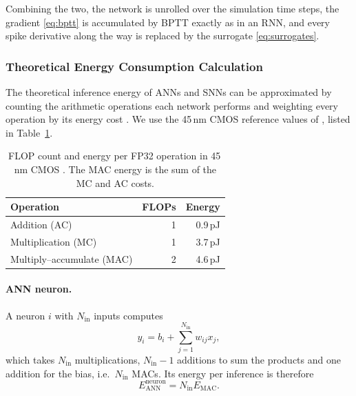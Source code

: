     Combining the two, the network is unrolled over the simulation time steps, the gradient \eqref{eq:bptt} is accumulated by BPTT exactly as in an RNN, and every spike derivative along the way is replaced by the surrogate \eqref{eq:surrogates}.

\subsubsection{Theoretical Energy Consumption Calculation}
The theoretical inference energy of ANNs and SNNs can be approximated by counting the arithmetic operations each network performs and weighting every operation by its energy cost \cite{kimSpikingYOLOSpikingNeural2019,suDeepDirectlyTrainedSpiking2023}. We use the 45\,nm CMOS reference values of \cite{horowitz11ComputingsEnergy2014}, listed in Table~\ref{tab:op_energy}.

\begin{table}[htbp]
    \centering
    \begin{tabular}{lrr}
        \hline
        Operation & FLOPs & Energy \\
        \hline
        Addition (AC) & 1 & 0.9\,pJ \\
        Multiplication (MC) & 1 & 3.7\,pJ \\
        Multiply--accumulate (MAC) & 2 & 4.6\,pJ \\
        \hline
    \end{tabular}
    \caption{FLOP count and energy per FP32 operation in 45\,nm CMOS \cite{horowitz11ComputingsEnergy2014}. The MAC energy is the sum of the MC and AC costs.}
    \label{tab:op_energy}
\end{table}

\paragraph{ANN neuron.} A neuron $i$ with $N_{\mathrm{in}}$ inputs computes
\begin{equation}
    y_i = b_i + \sum_{j=1}^{N_{\mathrm{in}}} w_{ij} x_j ,
    \label{eq:ann_synops}
\end{equation}
which takes $N_{\mathrm{in}}$ multiplications, $N_{\mathrm{in}}-1$ additions to sum the products and one addition for the bias, i.e.\ $N_{\mathrm{in}}$ MACs. Its energy per inference is therefore
\begin{equation}
    E_{\mathrm{ANN}}^{\mathrm{neuron}} = N_{\mathrm{in}} E_{\mathrm{MAC}} .
    \label{eq:energy_ann_neuron}
\end{equation}

